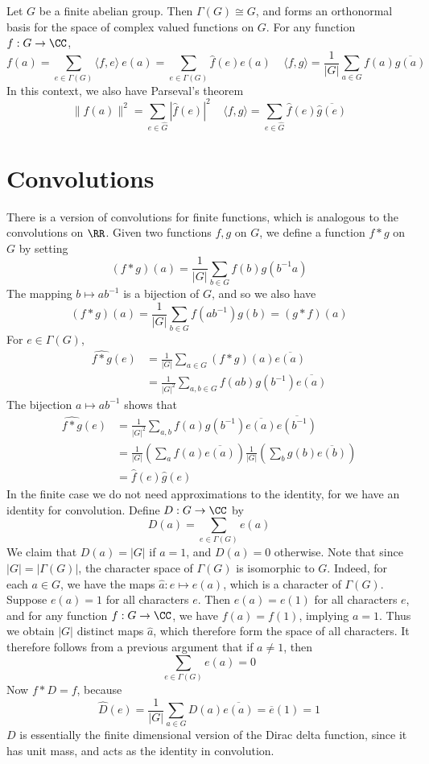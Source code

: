 \begin{theorem}
    Let $G$ be a finite abelian group. Then $\Gamma(G) \cong G$, and forms an orthonormal basis for the space of complex valued functions on $G$. For any function $f: G \to \CC$,
    \[ f(a) = \sum_{e \in \Gamma(G)} \langle f, e \rangle\ e(a) = \sum_{e \in \Gamma(G)} \hat{f}(e) e(a)\ \ \ \ \ \langle f, g \rangle = \frac{1}{|G|} \sum_{a \in G} f(a) \overline{g(a)} \]
    In this context, we also have Parseval's theorem
    \[ \| f(a) \|^2 = \sum_{e \in \hat{G}} |\widehat{f}(e)|^2\ \ \ \ \ \langle f, g \rangle = \sum_{e \in \hat{G}} \widehat{f}(e) \overline{\widehat{g}(e)} \]
\end{theorem}

\section{Convolutions}

There is a version of convolutions for finite functions, which is analogous to the convolutions on $\RR$. Given two functions $f,g$ on $G$, we define a function $f * g$ on $G$ by setting
%
\[ (f * g)(a) = \frac{1}{|G|} \sum_{b \in G} f(b) g(b^{-1} a) \]
%
The mapping $b \mapsto ab^{-1}$ is a bijection of $G$, and so we also have
%
\[ (f * g)(a) = \frac{1}{|G|} \sum_{b \in G} f(ab^{-1}) g(b) = (g * f)(a) \]
%
For $e \in \Gamma(G)$,
%
\begin{align*}
    \widehat{f * g}(e) &= \frac{1}{|G|} \sum_{a \in G} (f*g)(a) \overline{e(a)}\\
    &= \frac{1}{|G|^2} \sum_{a,b \in G} f(ab) g(b^{-1}) \overline{e(a)}
\end{align*}
%
The bijection $a \mapsto ab^{-1}$ shows that
%
\begin{align*}
    \widehat{f*g}(e) &= \frac{1}{|G|^2} \sum_{a,b} f(a) g(b^{-1}) \overline{e(a)} \overline{e(b^{-1})}\\
    &= \frac{1}{|G|} \left( \sum_a f(a) \overline{e(a)} \right) \frac{1}{|G|} \left( \sum_b g(b) \overline{e(b)} \right)\\
    &= \widehat{f}(e) \widehat{g}(e)
\end{align*}
%
In the finite case we do not need approximations to the identity, for we have an identity for convolution. Define $D: G \to \CC$ by
%
\[ D(a) = \sum_{e \in \Gamma(G)} e(a) \]
%
We claim that $D(a) = |G|$ if $a = 1$, and $D(a) = 0$ otherwise. Note that since $|G| = |\Gamma(G)|$, the character space of $\Gamma(G)$ is isomorphic to $G$. Indeed, for each $a \in G$, we have the maps $\widehat{a}: e \mapsto e(a)$, which is a character of $\Gamma(G)$. Suppose $e(a) = 1$ for all characters $e$. Then $e(a) = e(1)$ for all characters $e$, and for any function $f: G \to \CC$, we have $f(a) = f(1)$, implying $a = 1$. Thus we obtain $|G|$ distinct maps $\widehat{a}$, which therefore form the space of all characters. It therefore follows from a previous argument that if $a \neq 1$, then
%
\[ \sum_{e \in \Gamma(G)} e(a) = 0 \]
%
Now $f * D = f$, because
%
\[ \widehat{D}(e) = \frac{1}{|G|} \sum_{a \in G} D(a) \overline{e(a)} = \overline{e}(1) = 1 \]
%
$D$ is essentially the finite dimensional version of the Dirac delta function, since it has unit mass, and acts as the identity in convolution.

